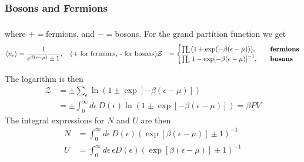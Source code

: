 \documentclass[a4paper, english, 12pt]{article}
\newcommand{\eps}{\epsilon}
\begin{document}
\begin{multicols*}{2}
\subsubsection*{\scriptsize Bosons and Fermions}

\begin{align*}
\end{align*}
where $+=$fermions, and $-=$bosons. For the grand partition function we get 
\begin{align*}
    \expval{n_\eps} &= \frac{1}{e^{\beta(\eps-\mu)} \pm 1},\quad(\text{+ for fermions, - for bosons})
    \mathcal{Z} &= \begin{cases}
        \prod_\eps (1+\exp(-\beta(\eps-\mu))),\quad&\textbf{fermions} \\ 
        \prod_\eps {1-\exp[-\beta(\eps-\mu)]}^{-1},\quad&\textbf{bosons}
    \end{cases}
\end{align*}

The logarithm is then 
\begin{align*}
    \mathcal{Z} &= \pm \sum_\eps \ln(1 \pm \exp[-\beta(\eps-\mu)]) \\ 
    &= \pm \int_0^\infty d\eps\, D(\eps) \ln(1 \pm \exp[-\beta(\eps-\mu)]) = \beta PV
\end{align*}
The integral expressions for $N$ and $U$ are then 
\begin{align*}
    N &= \int_0^\infty d\eps\,D(\eps) (\exp[\beta(\eps-\mu)]\pm1)^{-1} \\ 
    U &= \int_0^\infty d\eps\, \eps D(\eps) (\exp[\beta(\eps-\mu)]\pm1)^{-1}
\end{align*}



\end{multicols*}
\end{document}

